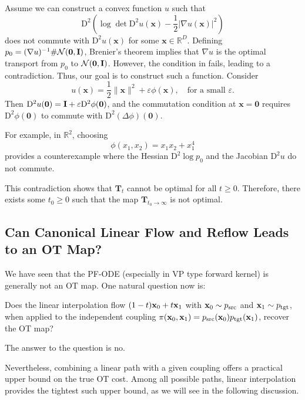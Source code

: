 Assume we can construct a convex function $u$ such that  
\[
\mathrm{D}^2 \left( \log \det \mathrm{D}^2 u(\mathbf{x}) - \frac{1}{2} \lvert \nabla u(\mathbf{x}) \rvert^2 \right)
\]
does not commute with $\mathrm{D}^2 u(\mathbf{x})$ for some $\mathbf{x} \in \mathbb{R}^D$.  Defining $p_0 = (\nabla u)^{-1} \# \mathcal{N}(\bm{0}, {\mathbf{I}})$, Brenier's theorem implies that $\nabla u$ is the optimal transport from $p_0$ to $\mathcal{N}(\bm{0}, {\mathbf{I}})$. However, the condition in  fails, leading to a contradiction. Thus, our goal is to construct such a function. 
Consider  
\[
u(\mathbf{x}) = \frac{1}{2} \|\mathbf{x}\|^2 + \varepsilon \phi(\mathbf{x}), \quad \text{for a small } \varepsilon.
\]
Then $\mathrm{D}^2 u(\mathbf{0}) = {\mathbf{I}} + \varepsilon \mathrm{D}^2 \phi(\mathbf{0})$, and the commutation condition at $\mathbf{x} = \mathbf{0}$ requires $\mathrm{D}^2 \phi(\mathbf{0})$ to commute with $\mathrm{D}^2 (\Delta \phi)(\mathbf{0})$. 

For example, in $\mathbb{R}^2$, choosing  
\[
\phi(x_1, x_2) = x_1 x_2 + x_1^4
\]
provides a counterexample where the Hessian $\mathrm{D}^2 \log p_0$ and the Jacobian $\mathrm{D}^2 u$ do not commute.

This contradiction shows that $\mathbf{T}_t$ cannot be optimal for all $t \geq 0$. Therefore, there exists some $t_0 \geq 0$ such that the map $\mathbf{T}_{t_0 \to \infty}$ is not optimal.

\newpage

\subsection{Can Canonical Linear Flow and Reflow Leads to an OT Map?}\label{subsec:ot-linear-reflow} 
We have seen that the PF-ODE (especially in VP type forward kernel) is generally not an OT map. One natural question now is:
\begin{question}
Does the linear interpolation flow $(1-t){\mathbf{x}}_0 + t {\mathbf{x}}_1$ with ${\mathbf{x}}_0\sim p_{\mathrm{src}}$ and ${\mathbf{x}}_1\sim p_{\mathrm{tgt}}$, when applied to the independent coupling $\pi({\mathbf{x}}_0, {\mathbf{x}}_1) = p_{\mathrm{src}}({\mathbf{x}}_0)p_{\mathrm{tgt}}({\mathbf{x}}_1)$, recover the OT map?
\end{question}
The answer to the question is no.
 
Nevertheless, combining a linear path with a given coupling offers a practical upper bound on the true OT cost.  Among all possible paths, linear interpolation provides the tightest such upper bound, as we will see in the following discussion.


